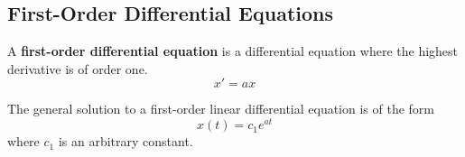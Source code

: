 \documentclass{article}
\begin{document}
\subsection{First-Order Differential Equations}
\begin{definition}
    A \textbf{first-order differential equation} is a differential
    equation where the highest derivative is of order one.
    \begin{equation*}
        x' = a x
    \end{equation*}
\end{definition}
\begin{theorem}
    The general solution to a first-order linear differential equation
    is of the form
    \begin{equation*}
        x\left( t \right) = c_1 e^{a t}
    \end{equation*}
    where \(c_1\) is an arbitrary constant.
\end{theorem}
\end{document}
